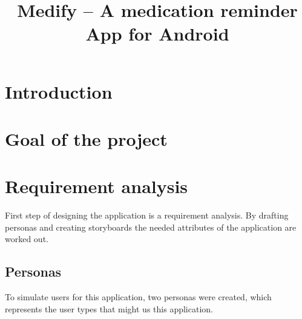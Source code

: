 \documentclass[conference]{IEEEtran}
\begin{document}
\title{Medify -- A medication reminder App for Android}

\author{}

\maketitle

\begin{abstract}
\lipsum[1][1-4] %
\end{abstract}

\section{Introduction}
\lipsum[2][1-10] %

\section{Goal of the project}
\lipsum[3][1-13] %

\section{Requirement analysis}
First step of designing the application is a requirement analysis. By drafting personas and creating storyboards
the needed attributes of the application are worked out.

\subsection{Personas}
To simulate users for this application, two personas were created, which represents the user types
that might us this application.
\end{document}
